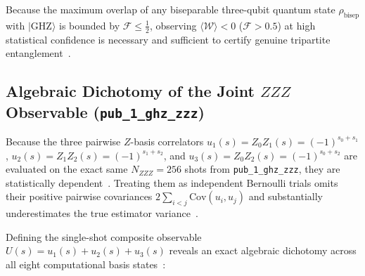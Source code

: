 \documentclass[10pt,letterpaper]{article}
\begin{document}
Because the maximum overlap of any biseparable three-qubit quantum state $\rho_{\text{bisep}}$ with $\vert \mathrm{GHZ} \rangle$ is bounded by $\mathcal{F} \le \frac{1}{2}$, observing $\langle \mathcal{W} \rangle < 0$ ($\mathcal{F} > 0.5$) at high statistical confidence is necessary and sufficient to certify genuine tripartite entanglement~\cite{qfx_doc}.

\subsection{Algebraic Dichotomy of the Joint \texorpdfstring{$ZZZ$}{ZZZ} Observable (\texttt{pub\_1\_ghz\_zzz})}

Because the three pairwise $Z$-basis correlators $u_1(s) = Z_0 Z_1(s) = (-1)^{s_0 + s_1}$, $u_2(s) = Z_1 Z_2(s) = (-1)^{s_1 + s_2}$, and $u_3(s) = Z_0 Z_2(s) = (-1)^{s_0 + s_2}$ are evaluated on the exact same $N_{ZZZ} = 256$ shots from \texttt{pub\_1\_ghz\_zzz}, they are statistically dependent~\cite{qfx_doc}. Treating them as independent Bernoulli trials omits their positive pairwise covariances $2\sum_{i<j}\mathrm{Cov}(u_i, u_j)$ and substantially underestimates the true estimator variance~\cite{qfx_doc}.

Defining the single-shot composite observable $U(s) = u_1(s) + u_2(s) + u_3(s)$ reveals an exact algebraic dichotomy across all eight computational basis states~\cite{qfx_doc}:
\end{document}
